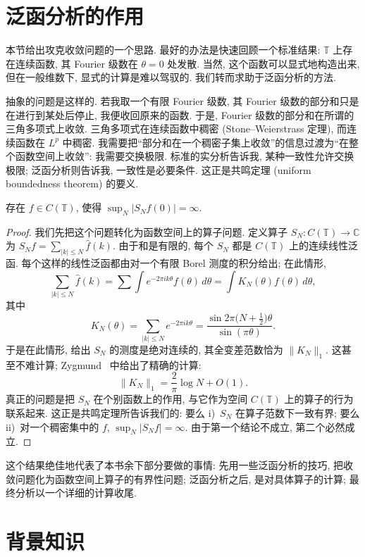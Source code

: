 \section{泛函分析的作用}
\label{sec:0.2}

本节给出攻克收敛问题的一个思路. 最好的办法是快速回顾一个标准结果: $\mathbb{T}$ 上存在连续函数, 其 Fourier 级数在 $\theta=0$ 处发散. 当然, 这个函数可以显式地构造出来, 但在一般维数下, 显式的计算是难以驾驭的. 我们转而求助于泛函分析的方法.

抽象的问题是这样的. 若我取一个有限 Fourier 级数, 其 Fourier 级数的部分和只是在进行到某处后停止, 我便收回原来的函数. 于是, Fourier 级数的部分和在所谓的三角多项式上收敛. 三角多项式在连续函数中稠密 (Stone--Weierstrass 定理), 而连续函数在 $L^p$ 中稠密. 我需要把``部分和在一个稠密子集上收敛''的信息过渡为``在整个函数空间上收敛'': 我需要交换极限. 标准的实分析告诉我, 某种一致性允许交换极限; 泛函分析则告诉我, 一致性是必要条件. 这正是共鸣定理 (uniform boundedness theorem) 的要义.

\begin{theorem}\label{thm:0.1}
存在 $f\in C(\mathbb{T})$, 使得 $\sup_N|S_Nf(0)|=\infty$.
\end{theorem}

\begin{proof}
我们先把这个问题转化为函数空间上的算子问题. 定义算子 $S_N:C(\mathbb{T})\to\mathbb{C}$ 为 $S_Nf=\sum_{|k|\leq N}\hat{f}(k)$. 由于和是有限的, 每个 $S_N$ 都是 $C(\mathbb{T})$ 上的连续线性泛函. 每个这样的线性泛函都由对一个有限 Borel 测度的积分给出; 在此情形,
\[
\sum_{|k|\leq N}\hat{f}(k)=\sum\int e^{-2\pi ik\theta}f(\theta)\,d\theta=\int K_N(\theta)f(\theta)\,d\theta,
\]
其中
\[
K_N(\theta)=\sum_{|k|\leq N}e^{-2\pi ik\theta}=\frac{\sin 2\pi\bigl(N+\frac{1}{2}\bigr)\theta}{\sin(\pi\theta)}.
\]
于是在此情形, 给出 $S_N$ 的测度是绝对连续的, 其全变差范数恰为 $\|K_N\|_1$. 这甚至不难计算; Zygmund~\cite{zygmund} 中给出了精确的计算:
\[
\|K_N\|_1=\frac{2}{\pi}\log N+O(1).
\]
真正的问题是把 $S_N$ 在个别函数上的作用, 与它作为空间 $C(\mathbb{T})$ 上的算子的行为联系起来. 这正是共鸣定理所告诉我们的: 要么 i)~$S_N$ 在算子范数下一致有界; 要么 ii)~对一个稠密集中的 $f$, $\sup_N|S_Nf|=\infty$. 由于第一个结论不成立, 第二个必然成立.
\end{proof}

这个结果绝佳地代表了本书余下部分要做的事情: 先用一些泛函分析的技巧, 把收敛问题化为函数空间上算子的有界性问题; 泛函分析之后, 是对具体算子的计算; 最终分析以一个详细的计算收尾.

\section{背景知识}
\label{sec:0.3}

